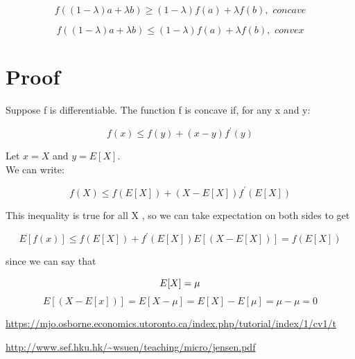 \documentclass[11pt]{article}
\begin{document}
\begin{equation}
f((1-\lambda)a + \lambda b) \geq (1-\lambda)f(a) + \lambda f(b), \textit{  concave}
\end{equation}

\begin{equation}
f((1-\lambda)a + \lambda b) \leq (1-\lambda)f(a) + \lambda f(b), \textit{  convex}
\end{equation}

\section{Proof}

Suppose f is differentiable. The function f is concave if, for any x and y:

\begin{equation}
f(x) \leq f(y) + (x-y) f^{\prime}(y)
\end{equation}

Let $x = X$ and $y = E[X]$. \\

We can write: 

\begin{equation}
f(X) \leq f(E[X]) + (X - E[X])f^{\prime}(E[X]) 
\end{equation}

This inequality is true for all X , so we can take expectation on both sides to get

\begin{equation}
E[f(x)] \leq f(E[X]) + f^{\prime}(E[X])E[(X - E[X])] = f(E[X]) 
\end{equation}

since we can say that 

\begin{equation}
E[X] = \mu \\
\end{equation}
\begin{equation}
E[(X - E[x])] = E[X - \mu] = E[X] - E[\mu] = \mu - \mu = 0 
\end{equation}

\begin{thebibliography}{99}


\url{https://mjo.osborne.economics.utoronto.ca/index.php/tutorial/index/1/cv1/t}

\url{http://www.sef.hku.hk/~wsuen/teaching/micro/jensen.pdf }
\end{thebibliography}
\end{document}
